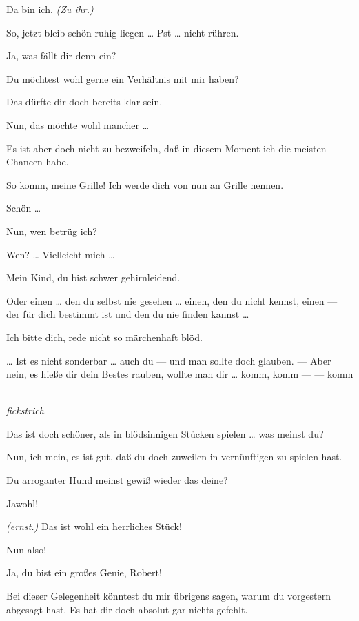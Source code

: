 \documentclass[
	final,
	a4paper,
	ngerman,
	mpinclude = true, %
	twoside = true,
	open = right,
	cleardoublepage = plain,
	DIV = 13,
	BCOR = 1cm,
	titlepage = firstiscover,
	]{scrbook}
\newcommand{\direction}[1]{\textit{(#1)}}
\newcommand{\hiat}{%
	\begin{center}
		\tiny
		\raisebox{0.5ex}{\rule{0.3\linewidth}{0.4pt}}
		\textit{fickstrich}
		\raisebox{0.5ex}{\rule{0.3\linewidth}{0.4pt}}
	\end{center}
}
\newcommand{\thecharacter}[1]{\textup{\textsc{#1}}\xspace}
\newcommand{\thedichter}{\thecharacter{Dichter}}
\newcommand{\theschauspielerin}{\thecharacter{Schauspielerin}}
\newcommand{\character}[1]{\item[#1:]}
\newcommand{\dichter}{\character{\thedichter}}
\newcommand{\schauspielerin}{\character{\theschauspielerin}}
\begin{document}
\begin{play}
	\dichter
	Da bin ich. \direction{Zu ihr.}

	\schauspielerin
	So, jetzt bleib schön ruhig liegen \ldots{} Pst \ldots{} nicht rühren.

	\dichter
	Ja, was fällt dir denn ein?

	\schauspielerin
	Du möchtest wohl gerne ein Verhältnis mit mir haben?

	\dichter
	Das dürfte dir doch bereits klar sein.

	\schauspielerin
	Nun, das möchte wohl mancher \ldots{}

	\dichter
	Es ist aber doch nicht zu bezweifeln, daß in diesem Moment ich die meisten Chancen habe.

	\schauspielerin
	So komm, meine Grille! Ich werde dich von nun an Grille nennen.

	\dichter
	Schön \ldots{}

	\schauspielerin
	Nun, wen betrüg ich?

	\dichter
	Wen? \ldots{} Vielleicht mich \ldots{}

	\schauspielerin
	Mein Kind, du bist schwer gehirnleidend.

	\dichter
	Oder einen \ldots{} den du selbst nie gesehen \ldots{} einen, den du nicht kennst, einen --- der für dich bestimmt ist und den du nie finden kannst \ldots{}

	\schauspielerin
	Ich bitte dich, rede nicht so märchenhaft blöd.

	\dichter
	\ldots{} Ist es nicht sonderbar \ldots{} auch du --- und man sollte doch glauben. --- Aber nein, es hieße dir dein Bestes rauben, wollte man dir \ldots{} komm, komm --- --- komm ---

	\hiat

	\schauspielerin
	Das ist doch schöner, als in blödsinnigen Stücken spielen \ldots{} was meinst du?

	\dichter
	Nun, ich mein, es ist gut, daß du doch zuweilen in vernünftigen zu spielen hast.

	\schauspielerin
	Du arroganter Hund meinst gewiß wieder das deine?

	\dichter
	Jawohl!

	\schauspielerin
	\direction{ernst.} Das ist wohl ein herrliches Stück!

	\dichter
	Nun also!

	\schauspielerin
	Ja, du bist ein großes Genie, Robert!

	\dichter
	Bei dieser Gelegenheit könntest du mir übrigens sagen, warum du vorgestern abgesagt hast. Es hat dir doch absolut gar nichts gefehlt.


\end{play}
\end{document}
